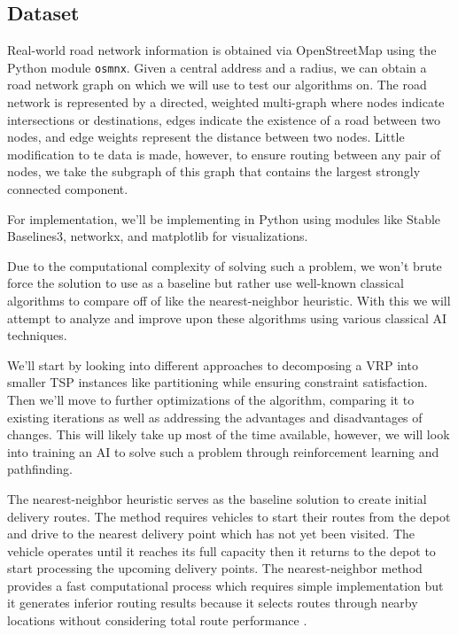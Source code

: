 \documentclass[conference]{IEEEtran}
\begin{document}
\subsection{Dataset}

Real-world road network information is obtained via OpenStreetMap using the Python module \verb|osmnx|. Given a central address and a radius, we can obtain a road network graph on which we will use to test our algorithms on. The road network is represented by a directed, weighted multi-graph where nodes indicate intersections or destinations, edges indicate the existence of a road between two nodes, and edge weights represent the distance between two nodes. Little modification to te data is made, however, to ensure routing between any pair of nodes, we take the subgraph of this graph that contains the largest strongly connected component.

For implementation, we'll be implementing in Python using modules like Stable Baselines3, networkx, and matplotlib for visualizations.


Due to the computational complexity of solving such a problem, we won't brute force the solution to use as a baseline but rather use well-known classical algorithms to compare off of like the nearest-neighbor heuristic. With this we will attempt to analyze and improve upon these algorithms using various classical AI techniques.

We'll start by looking into different approaches to decomposing a VRP into smaller TSP instances like partitioning while ensuring constraint satisfaction. Then we'll move to further optimizations of the algorithm, comparing it to existing iterations as well as addressing the advantages and disadvantages of changes. This will likely take up most of the time available, however, we will look into training an AI to solve such a problem through reinforcement learning and pathfinding.

The nearest-neighbor heuristic serves as the baseline solution to create initial delivery routes. The method requires vehicles to start their routes from the depot and drive to the nearest delivery point which has not yet been visited. The vehicle operates until it reaches its full capacity then it returns to the depot to start processing the upcoming delivery points. The nearest-neighbor method provides a fast computational process which requires simple implementation but it generates inferior routing results because it selects routes through nearby locations without considering total route performance \cite{Golden2008}.
\end{document}

